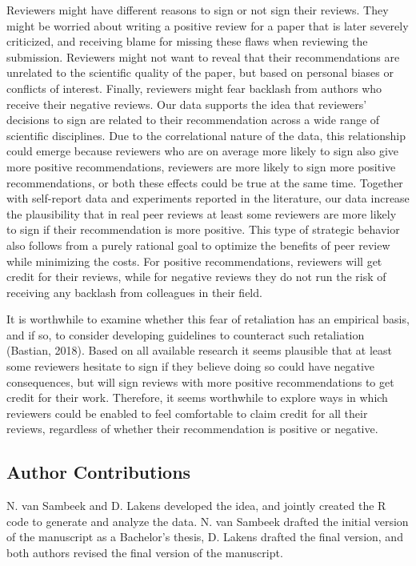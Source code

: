 \documentclass[
  english,
  ,jou, a4paper,floatsintext]{apa6}
\begin{document}
Reviewers might have different reasons to sign or not sign their reviews. They might be worried about writing a positive review for a paper that is later severely criticized, and receiving blame for missing these flaws when reviewing the submission. Reviewers might not want to reveal that their recommendations are unrelated to the scientific quality of the paper, but based on personal biases or conflicts of interest. Finally, reviewers might fear backlash from authors who receive their negative reviews. Our data supports the idea that reviewers' decisions to sign are related to their recommendation across a wide range of scientific disciplines. Due to the correlational nature of the data, this relationship could emerge because reviewers who are on average more likely to sign also give more positive recommendations, reviewers are more likely to sign more positive recommendations, or both these effects could be true at the same time. Together with self-report data and experiments reported in the literature, our data increase the plausibility that in real peer reviews at least some reviewers are more likely to sign if their recommendation is more positive. This type of strategic behavior also follows from a purely rational goal to optimize the benefits of peer review while minimizing the costs. For positive recommendations, reviewers will get credit for their reviews, while for negative reviews they do not run the risk of receiving any backlash from colleagues in their field.

It is worthwhile to examine whether this fear of retaliation has an empirical basis, and if so, to consider developing guidelines to counteract such retaliation (Bastian, 2018). Based on all available research it seems plausible that at least some reviewers hesitate to sign if they believe doing so could have negative consequences, but will sign reviews with more positive recommendations to get credit for their work. Therefore, it seems worthwhile to explore ways in which reviewers could be enabled to feel comfortable to claim credit for all their reviews, regardless of whether their recommendation is positive or negative.

\hypertarget{author-contributions}{%
\subsection{Author Contributions}\label{author-contributions}}

N. van Sambeek and D. Lakens developed the idea, and jointly created the R code to generate and analyze the data. N. van Sambeek drafted the initial version of the manuscript as a Bachelor's thesis, D. Lakens drafted the final version, and both authors revised the final version of the manuscript.
\end{document}
